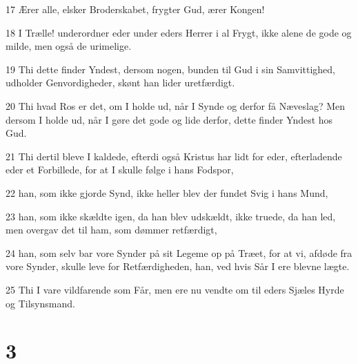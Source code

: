 \par 17 Ærer alle, elsker Broderskabet, frygter Gud, ærer Kongen!
\par 18 I Trælle! underordner eder under eders Herrer i al Frygt, ikke alene de gode og milde, men også de urimelige.
\par 19 Thi dette finder Yndest, dersom nogen, bunden til Gud i sin Samvittighed, udholder Genvordigheder, skønt han lider uretfærdigt.
\par 20 Thi hvad Ros er det, om I holde ud, når I Synde og derfor få Næveslag? Men dersom I holde ud, når I gøre det gode og lide derfor, dette finder Yndest hos Gud.
\par 21 Thi dertil bleve I kaldede, efterdi også Kristus har lidt for eder, efterladende eder et Forbillede, for at I skulle følge i hans Fodspor,
\par 22 han, som ikke gjorde Synd, ikke heller blev der fundet Svig i hans Mund,
\par 23 han, som ikke skældte igen, da han blev udskældt, ikke truede, da han led, men overgav det til ham, som dømmer retfærdigt,
\par 24 han, som selv bar vore Synder på sit Legeme op på Træet, for at vi, afdøde fra vore Synder, skulle leve for Retfærdigheden, han, ved hvis Sår I ere blevne lægte.
\par 25 Thi I vare vildfarende som Får, men ere nu vendte om til eders Sjæles Hyrde og Tilsynsmand.

\chapter{3}

